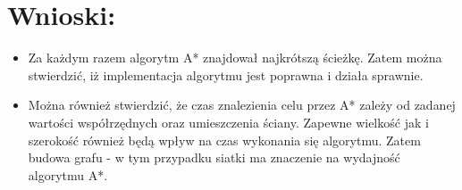 \documentclass{article}
\begin{document}
\section{Wnioski:}
\begin{itemize}
  \item Za każdym razem algorytm A* znajdował najkrótszą ścieżkę. Zatem można stwierdzić, iż implementacja algorytmu jest poprawna i działa sprawnie. 
  \item Można również stwierdzić, że czas znalezienia celu przez A* zależy od zadanej wartości współrzędnych oraz umieszczenia ściany. Zapewne wielkość jak i szerokość również będą wpływ na czas wykonania się algorytmu. Zatem budowa grafu - w tym przypadku siatki ma znaczenie na wydajność algorytmu A*.
\end{itemize}
\end{document}
